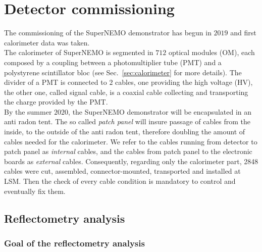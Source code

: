 \chapter{Detector commissioning}
\label{ch:commissioning}

The commissioning of the SuperNEMO demonstrator has begun in $2019$ and first calorimeter data was taken.\\
The calorimeter of SuperNEMO is segmented in $712$ optical modules (OM), each composed by a coupling between a photomultiplier tube (PMT) and a polystyrene scintillator bloc (see Sec.~\ref{sec:calorimeter} for more details).
The divider of a PMT is connected to $2$ cables, one providing the high voltage (HV), the other one, called signal cable, is a coaxial cable collecting and transporting the charge provided by the PMT.\\
By the summer $2020$, the SuperNEMO demonstrator will be encapsulated in an anti radon tent.
The so called \emph{patch panel} will insure passage of cables from the inside, to the outside of the anti radon tent, therefore doubling the amount of cables needed for the calorimeter.
We refer to the cables running from detector to patch panel as \emph{internal} cables, and the cables from patch panel to the electronic boards as \emph{external} cables.
Consequently, regarding only the calorimeter part, 2848 cables were cut, assembled, connector-mounted, transported and installed at LSM.
Then the check of every cable condition is mandatory to control and eventually fix them.

\section{Reflectometry analysis}
\label{sec:reflecto}

\subsection{Goal of the reflectometry analysis}

